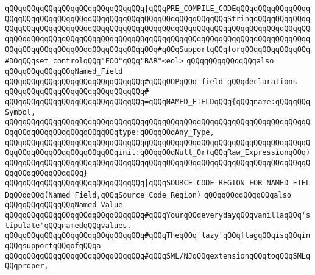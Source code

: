 \newline
\verb|qQQqqQQqqQQqqQQqqQQqqQQqqQQqqQQq|\verb#|qQQqPRE_COMPILE_CODEqQQqqQQqqQQqqQQqqQQqqQQqqQQqqQQqqQQqqQQqqQQqqQQqqQQqqQQqqQQqqQQqqQQqStringqQQqqQQqqQQqqQQqqQQqqQQqqQQqqQQqqQQqqQQqqQQqqQQqqQQqqQQqqQQqqQQqqQQqqQQqqQQqqQQqqQQqqQQqqQQqqQQqqQQqqQQqqQQqqQQqqQQqqQQqqQQqqQQqqQQqqQQqqQQqqQQqqQQqqQQqqQQqqQQqqQQqqQQqqQQqqQQqqQQqqQQqqQQq#\verb|#qQQqSupportqQQqforqQQqqQQqqQQqqQQq#DOqQQqset_controlqQQq"FOO"qQQq"BAR"<eol>|\newline
\newline
\newline
\verb|qQQqqQQqqQQqqQQqalso|\newline
\verb|qQQqqQQqqQQqqQQqNamed_Field|\newline
\newline
\verb|qQQqqQQqqQQqqQQqqQQqqQQqqQQqqQQq#qQQqOOPqQQq'field'qQQqdeclarations|\newline
\verb|qQQqqQQqqQQqqQQqqQQqqQQqqQQqqQQq#|\newline
\verb|qQQqqQQqqQQqqQQqqQQqqQQqqQQqqQQq=qQQqNAMED_FIELDqQQq{qQQqname:qQQqqQQqSymbol,|\newline
\verb|qQQqqQQqqQQqqQQqqQQqqQQqqQQqqQQqqQQqqQQqqQQqqQQqqQQqqQQqqQQqqQQqqQQqqQQqqQQqqQQqqQQqqQQqqQQqqQQqtype:qQQqqQQqAny_Type,|\newline
\verb|qQQqqQQqqQQqqQQqqQQqqQQqqQQqqQQqqQQqqQQqqQQqqQQqqQQqqQQqqQQqqQQqqQQqqQQqqQQqqQQqqQQqqQQqqQQqqQQqinit:qQQqqQQqNull_Or(qQQqRaw_ExpressionqQQq)|\newline
\verb|qQQqqQQqqQQqqQQqqQQqqQQqqQQqqQQqqQQqqQQqqQQqqQQqqQQqqQQqqQQqqQQqqQQqqQQqqQQqqQQqqQQqqQQq}|\newline
\newline
\verb|qQQqqQQqqQQqqQQqqQQqqQQqqQQqqQQq|\verb#|qQQqSOURCE_CODE_REGION_FOR_NAMED_FIELDqQQqqQQq(Named_Field,qQQqSource_Code_Region)#\newline
\newline
\newline
\newline
\verb|qQQqqQQqqQQqqQQqalso|\newline
\verb|qQQqqQQqqQQqqQQqNamed_Value|\newline
\newline
\verb|qQQqqQQqqQQqqQQqqQQqqQQqqQQqqQQq#qQQqYourqQQqeverydayqQQqvanillaqQQq'stipulate'qQQqnamedqQQqvalues.|\newline
\verb|qQQqqQQqqQQqqQQqqQQqqQQqqQQqqQQq#qQQqTheqQQq'lazy'qQQqflagqQQqisqQQqinqQQqsupportqQQqofqQQqa|\newline
\verb|qQQqqQQqqQQqqQQqqQQqqQQqqQQqqQQq#qQQqSML/NJqQQqextensionqQQqtoqQQqSMLqQQqproper,|\newline
